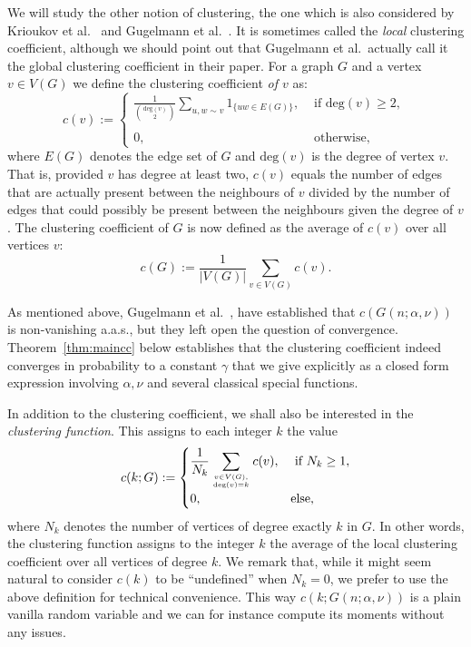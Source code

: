We will study the other notion of clustering, the one which is also considered by Krioukov et al.~\cite{krioukov2010hyperbolic} and Gugelmann et al.~\cite{gugelmann2012random}. It is sometimes called the {\em local} clustering coefficient, although we should point out that Gugelmann et al.~actually call it the global clustering coefficient in their paper. For a graph $G$ and a vertex $v\in V(G)$ we define the clustering coefficient {\em of $v$} as:
\[
	c(v) := \left\{\begin{array}{cl}
		\displaystyle \frac{1}{{\text{deg}(v)\choose 2}} \sum_{u,w\sim v} 1_{\{uw \in E(G)\}}, 
			& \text{ if $\text{deg}(v) \geq 2$, }\\
		& \\
        0, & \text{ otherwise,}
        \end{array}\right.
\]
where $E(G)$ denotes the edge set of $G$ and $\text{deg}(v)$ is the degree of vertex $v$. That is, provided $v$ has degree at least two, $c(v)$ equals the number of edges that are actually present between the neighbours  of $v$ divided by the number of edges that could possibly be present between the neighbours given the degree of $v$.
The clustering coefficient of $G$ is now defined as the average of $c(v)$ over all vertices $v$:
\[
	c(G) := \frac{1}{|V(G)|} \sum_{v\in V(G)} c(v).
\]

As mentioned above, Gugelmann et al.~\cite{gugelmann2012random}, have established that $c(G(n;\alpha,\nu))$ is non-vanishing a.a.s., but they left open the question of convergence. Theorem~\ref{thm:maincc} below establishes that the clustering coefficient indeed converges in probability to a constant $\gamma$ that we give explicitly as a closed form expression involving $\alpha,\nu$ and several classical special functions.

In addition to the clustering coefficient, we shall also be interested in the {\em clustering function}.
This assigns to each integer $k$ the value
\begin{equation}\label{eq:def_clustering_function}
	c(k; G) := \begin{cases}
		\displaystyle \frac{1}{N_k} \sum_{v \in V(G), \atop \text{deg}(v)=k}  c(v),  &\mbox{ if } N_k \ge 1,\\
		0, &\mbox{else,}
	\end{cases}
\end{equation}
where $N_k$ denotes the number of vertices of degree exactly $k$ in $G$. In other words, the clustering function assigns to the integer $k$ the average of the local clustering coefficient over all vertices of degree $k$. We remark that, while it might seem natural to consider $c(k)$ to be ``undefined'' when $N_k=0$, we prefer to use the above definition for technical 
convenience.  This way $c(k; G(n;\alpha,\nu) )$ is a plain vanilla random variable and we can for instance compute its moments without any issues.

